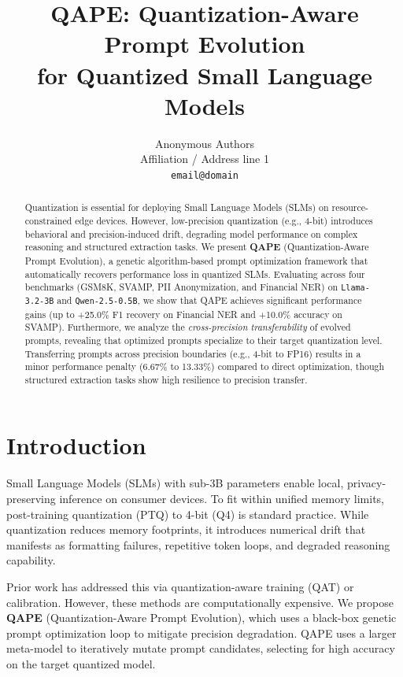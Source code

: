 \documentclass[11pt]{article}
\title{QAPE: Quantization-Aware Prompt Evolution \\ for Quantized Small Language Models}
\author{Anonymous Authors \\
  Affiliation / Address line 1 \\
  \texttt{email@domain} \\}
\begin{document}
\maketitle

\begin{abstract}
Quantization is essential for deploying Small Language Models (SLMs) on resource-constrained edge devices. However, low-precision quantization (e.g., 4-bit) introduces behavioral and precision-induced drift, degrading model performance on complex reasoning and structured extraction tasks. We present \textbf{QAPE} (Quantization-Aware Prompt Evolution), a genetic algorithm-based prompt optimization framework that automatically recovers performance loss in quantized SLMs. Evaluating across four benchmarks (GSM8K, SVAMP, PII Anonymization, and Financial NER) on \texttt{Llama-3.2-3B} and \texttt{Qwen-2.5-0.5B}, we show that QAPE achieves significant performance gains (up to +25.0\% F1 recovery on Financial NER and +10.0\% accuracy on SVAMP). Furthermore, we analyze the \textit{cross-precision transferability} of evolved prompts, revealing that optimized prompts specialize to their target quantization level. Transferring prompts across precision boundaries (e.g., 4-bit to FP16) results in a minor performance penalty (6.67\% to 13.33\%) compared to direct optimization, though structured extraction tasks show high resilience to precision transfer.
\end{abstract}

\section{Introduction}
Small Language Models (SLMs) with sub-3B parameters enable local, privacy-preserving inference on consumer devices. To fit within unified memory limits, post-training quantization (PTQ) to 4-bit (Q4) is standard practice. While quantization reduces memory footprints, it introduces numerical drift that manifests as formatting failures, repetitive token loops, and degraded reasoning capability. 

Prior work has addressed this via quantization-aware training (QAT) or calibration. However, these methods are computationally expensive. We propose \textbf{QAPE} (Quantization-Aware Prompt Evolution), which uses a black-box genetic prompt optimization loop to mitigate precision degradation. QAPE uses a larger meta-model to iteratively mutate prompt candidates, selecting for high accuracy on the target quantized model.
\end{document}
